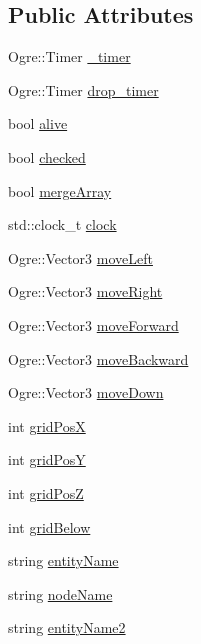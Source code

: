 \subsection*{Public Attributes}
\begin{DoxyCompactItemize}
\item 
Ogre\-::\-Timer \hyperlink{class_cube_a18c8c6e055160dde284d46a60dedc92a}{\-\_\-timer}
\item 
Ogre\-::\-Timer \hyperlink{class_cube_ad3bb6ae7badac1e670fcf162a8221066}{drop\-\_\-timer}
\item 
bool \hyperlink{class_cube_a980ce3408a24527d888e4b3909824506}{alive}
\item 
bool \hyperlink{class_cube_a2bb4390eb460a9cf29de2ca916a4a9ec}{checked}
\item 
bool \hyperlink{class_cube_ad3d76d07ee2fc90ede8dfe807480002f}{merge\-Array}
\item 
std\-::clock\-\_\-t \hyperlink{class_cube_ab100528af7d9cd8c40aa85b3eeb582d3}{clock}
\item 
Ogre\-::\-Vector3 \hyperlink{class_cube_a826e1bab8cac54c8b8fdbded40deb5c4}{move\-Left}
\item 
Ogre\-::\-Vector3 \hyperlink{class_cube_a1fc7acbf2fea6ef489c16634f316f8c7}{move\-Right}
\item 
Ogre\-::\-Vector3 \hyperlink{class_cube_a753844c06abc292f38ae4e496d192cc6}{move\-Forward}
\item 
Ogre\-::\-Vector3 \hyperlink{class_cube_aa7536967e2fdaaaa68a01d380ae5e2ab}{move\-Backward}
\item 
Ogre\-::\-Vector3 \hyperlink{class_cube_a187bae124402e077fd574b245d029721}{move\-Down}
\item 
int \hyperlink{class_cube_aface2c639c17ae3bb1180c165727b36c}{grid\-Pos\-X}
\item 
int \hyperlink{class_cube_a9b3f7676b19910f48842d6a7bee025b0}{grid\-Pos\-Y}
\item 
int \hyperlink{class_cube_a40c395b356dbdd774dc24d870075fa7e}{grid\-Pos\-Z}
\item 
int \hyperlink{class_cube_af26a12fc948b957c304f584ad285b02a}{grid\-Below}
\item 
string \hyperlink{class_cube_a30a863d3f3d7048207a90903e961c208}{entity\-Name}
\item 
string \hyperlink{class_cube_a6f2b818098957d9fbc86b4c419687b40}{node\-Name}
\item 
string \hyperlink{class_cube_a724c741e2b66fca73a76de2b644a80e8}{entity\-Name2}
\item 

\end{DoxyCompactItemize}
